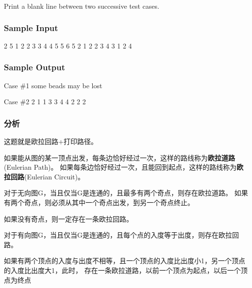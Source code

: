 Print a blank line between two successive test cases.

\subsubsection{Sample Input}
\begin{Code}
2
5
1 2
2 3
3 4
4 5
5 6
5
2 1
2 2
3 4
3 1
2 4
\end{Code}

\subsubsection{Sample Output}
\begin{Code}
Case \#1
some beads may be lost

Case \#2
2 1
1 3
3 4
4 2
2 2
\end{Code}

\subsubsection{分析}
这题就是欧拉回路+打印路径。

如果能从图的某一顶点出发，每条边恰好经过一次，这样的路线称为\textbf{欧拉道路}(Eulerian Path)。
如果每条边恰好经过一次，且能回到起点，这样的路线称为\textbf{欧拉回路}(Eulerian Circuit)。

对于无向图G，当且仅当G是连通的，且最多有两个奇点，则存在欧拉道路。
如果有两个奇点，则必须从其中一个奇点出发，到另一个奇点终止。

如果没有奇点，则一定存在一条欧拉回路。

对于有向图G，当且仅当G是连通的，且每个点的入度等于出度，则存在欧拉回路。

如果有两个顶点的入度与出度不相等，且一个顶点的入度比出度小1，另一个顶点的入度比出度大1，此时，
存在一条欧拉道路，以前一个顶点为起点，以后一个顶点为终点

